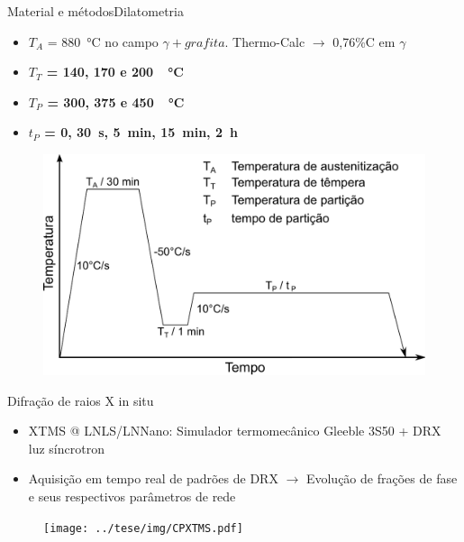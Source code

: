 \begin{frame}{Material e métodos}{Dilatometria}
  \begin{itemize}
    \item $T_A$ = \SI{880}{\degreeCelsius} no campo $\gamma + grafita$. Thermo-Calc\textregistered{} $\rightarrow$ 0,76\%C em $\gamma$
    \item \textbf{$T_T$ = 140, 170 e 200~\SI{}{\degreeCelsius}}
    \item \textbf{$T_P$ = 300, 375 e 450~\SI{}{\degreeCelsius}}
    \item \textbf{$t_P$ = 0, 30~s, 5~min, 15~min, 2~h}
  \end{itemize}

  \begin{figure}
    \includegraphics[width=.8\textwidth]{img/expproc_dil.pdf}
  \end{figure}
\end{frame}

\begin{frame}{Difração de raios X in situ}
  \begin{itemize}
    \item XTMS @ LNLS/LNNano: Simulador termomecânico Gleeble\textregistered{} 3S50 + DRX luz síncrotron
    \item Aquisição em tempo real de padrões de DRX $\rightarrow$ Evolução de frações de fase e seus respectivos parâmetros de rede
  \end{itemize}

  \begin{figure}
    \texttt{[image: ../tese/img/CPXTMS.pdf]}
  \end{figure}
\end{frame}

